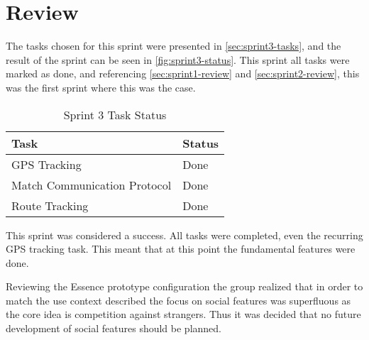 \section{Review}
\label{sec:sprint3-review}

The tasks chosen for this sprint were presented in \autoref{sec:sprint3-tasks}, and the result of the sprint can be seen in \autoref{fig:sprint3-status}. This sprint all tasks were marked as done, and referencing \autoref{sec:sprint1-review} and \autoref{sec:sprint2-review}, this was the first sprint where this was the case.

\begin{table}[!ht]
	\centering
	\caption{Sprint 3 Task Status}
	\label{fig:sprint3-status}
	\begin{tabular}{|l|l|}
		\hline
		\textbf{Task} & \textbf{Status} \\
		\hline
		\ac{GPS} Tracking & Done \\
		\hline
		Match Communication Protocol & Done \\
		\hline
		Route Tracking & Done \\
		\hline
	\end{tabular}
\end{table}

This sprint was considered a success. All tasks were completed, even the recurring \ac{GPS} tracking task. This meant that at this point the fundamental features were done.

Reviewing the Essence prototype configuration the group realized that in order to match the use context described the focus on social features was superfluous as the core idea is competition against strangers. Thus it was decided that no future development of social features should be planned. 
